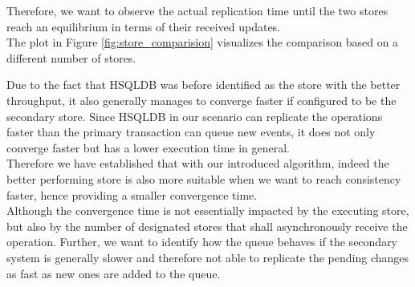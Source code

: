 Therefore, we want to observe the actual replication time until the two stores reach an equilibrium in terms of their received updates.\\
The plot in Figure \ref{fig:store_comparision} visualizes the comparison based on a different number of stores.

Due to the fact that HSQLDB was before identified as the store with the better throughput, 
it also generally manages to converge faster if configured to be the secondary store. 
Since HSQLDB in our scenario can replicate the operations faster than the primary transaction can queue new events,
it does not only converge faster but has a lower execution time in general.\\
Therefore we have established that with our introduced algorithm, indeed
the better performing store is also more suitable when we want to reach consistency faster, hence providing a smaller convergence time.\\




Although the convergence time is not essentially impacted by the executing store, but also by the number of designated stores that shall asynchronously 
receive the operation. 
Further, we want to identify how the queue behaves if the secondary system is generally slower and therefore not able to replicate 
the pending changes as fast as new ones are added to the queue.



